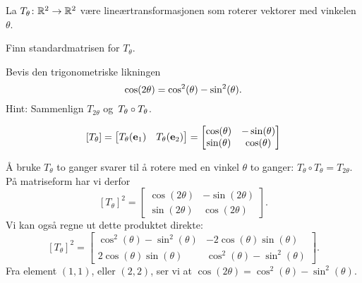 \begin{oppgave}
La $T_\theta \colon \mathbb{R}^2 \to \mathbb{R}^2$ være lineærtransformasjonen som
roterer vektorer med vinkelen $\theta$.

\begin{punkt}
Finn standardmatrisen for $T_\theta$.
\end{punkt}

\begin{punkt}
Bevis den trigonometriske likningen
\vspace{-4pt}
\[
\cos(2\theta)=\cos^2(\theta)-\sin^2 (\theta).
\vspace{-3pt}
\]
Hint: Sammenlign $T_{2\theta}$ og~$T_{\theta} \circ T_{\theta}$.
\end{punkt}


\end{oppgave}

\begin{losning}

\begin{punkt}
$$[T_\theta]=\begin{bmatrix}
T_\theta(\mathbf{e}_1) & T_\theta(\mathbf{e}_2)
\end{bmatrix} = \begin{bmatrix}
\cos(\theta) & -\sin(\theta)\\
\sin(\theta) & \cos(\theta)
\end{bmatrix}$$

\end{punkt}

\begin{punkt}
Å bruke $T_\theta$ to ganger svarer til å rotere med en vinkel $\theta$ to ganger: $T_\theta \circ T_\theta=T_{2\theta}$.
På matriseform har vi derfor $$[T_\theta]^2= \begin{bmatrix}
\cos(2\theta) & -\sin(2\theta)\\
\sin(2\theta) & \cos(2\theta)
\end{bmatrix}.$$ Vi kan også regne ut dette produktet direkte:
$$[T_\theta]^2=\begin{bmatrix}
\cos^2(\theta)-\sin^2(\theta) & -2\cos(\theta)\sin(\theta)\\
2\cos(\theta)\sin(\theta) & \cos^2(\theta)-\sin^2(\theta)
\end{bmatrix}.$$ Fra element $(1,1)$, eller $(2,2)$, ser vi at $\cos(2\theta)=\cos^2(\theta)-\sin^2(\theta)$.

\end{punkt}

\end{losning}


